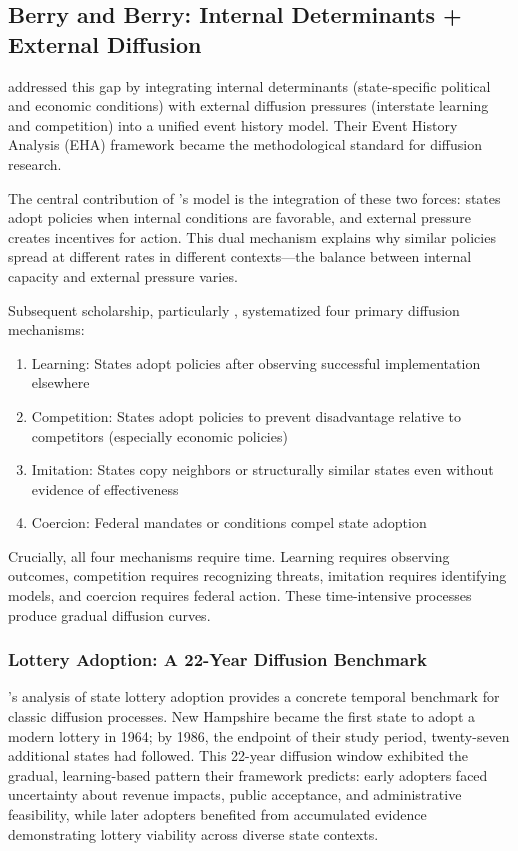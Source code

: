 \subsection{Berry and Berry: Internal Determinants + External Diffusion}

\textcite{berryStateLotteryAdoptions1990} addressed this gap by integrating internal determinants (state-specific political and economic conditions) with external diffusion pressures (interstate learning and competition) into a unified event history model. Their Event History Analysis (EHA) framework became the methodological standard for diffusion research.

The central contribution of \textcite{berryStateLotteryAdoptions1990}'s model is the integration of these two forces: states adopt policies when internal conditions are favorable, and external pressure creates incentives for action. This dual mechanism explains why similar policies spread at different rates in different contexts—the balance between internal capacity and external pressure varies.

Subsequent scholarship, particularly \textcite{shipanMechanismsPolicyDiffusion2008a}, systematized four primary diffusion mechanisms:

\begin{enumerate}
\item Learning: States adopt policies after observing successful implementation elsewhere
\item Competition: States adopt policies to prevent disadvantage relative to competitors (especially economic policies)
\item Imitation: States copy neighbors or structurally similar states even without evidence of effectiveness
\item Coercion: Federal mandates or conditions compel state adoption
\end{enumerate}

Crucially, all four mechanisms require time. Learning requires observing outcomes, competition requires recognizing threats, imitation requires identifying models, and coercion requires federal action. These time-intensive processes produce gradual diffusion curves.

\subsubsection{Lottery Adoption: A 22-Year Diffusion Benchmark}
\textcite{berryStateLotteryAdoptions1990}'s analysis of state lottery adoption provides a concrete temporal benchmark for classic diffusion processes. New Hampshire became the first state to adopt a modern lottery in 1964; by 1986, the endpoint of their study period, twenty-seven additional states had followed. This 22-year diffusion window exhibited the gradual, learning-based pattern their framework predicts: early adopters faced uncertainty about revenue impacts, public acceptance, and administrative feasibility, while later adopters benefited from accumulated evidence demonstrating lottery viability across diverse state contexts.

